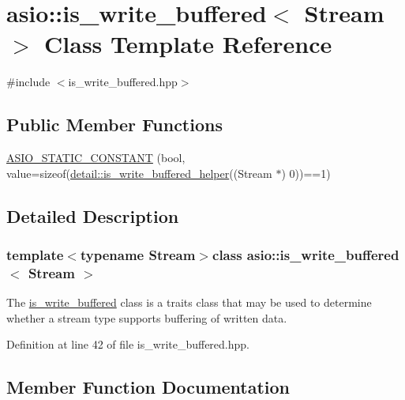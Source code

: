 \hypertarget{classasio_1_1is__write__buffered}{}\section{asio\+:\+:is\+\_\+write\+\_\+buffered$<$ Stream $>$ Class Template Reference}
\label{classasio_1_1is__write__buffered}


{\ttfamily \#include $<$is\+\_\+write\+\_\+buffered.\+hpp$>$}

\subsection*{Public Member Functions}
\begin{DoxyCompactItemize}
\item 
\hyperlink{classasio_1_1is__write__buffered_a696f85ff1a8dd1eb4f40e25fa266ee4c}{A\+S\+I\+O\+\_\+\+S\+T\+A\+T\+I\+C\+\_\+\+C\+O\+N\+S\+T\+A\+N\+T} (bool, value=sizeof(\hyperlink{namespaceasio_1_1detail_a92c09d4f26720d51674e29602933009c}{detail\+::is\+\_\+write\+\_\+buffered\+\_\+helper}((Stream $\ast$) 0))==1)
\end{DoxyCompactItemize}


\subsection{Detailed Description}
\subsubsection*{template$<$typename Stream$>$class asio\+::is\+\_\+write\+\_\+buffered$<$ Stream $>$}

The \hyperlink{classasio_1_1is__write__buffered}{is\+\_\+write\+\_\+buffered} class is a traits class that may be used to determine whether a stream type supports buffering of written data. 

Definition at line 42 of file is\+\_\+write\+\_\+buffered.\+hpp.



\subsection{Member Function Documentation}
\hypertarget{classasio_1_1is__write__buffered_a696f85ff1a8dd1eb4f40e25fa266ee4c}{}
